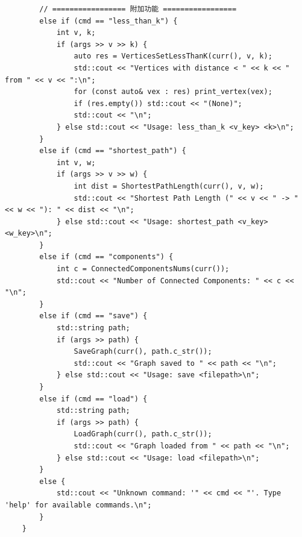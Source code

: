 \documentclass[supercite]{Experimental_Report}
\theoremstyle{definition}
\begin{document}
\begin{lstlisting}
		// ================= 附加功能 =================
		else if (cmd == "less_than_k") {
			int v, k;
			if (args >> v >> k) {
				auto res = VerticesSetLessThanK(curr(), v, k);
				std::cout << "Vertices with distance < " << k << " from " << v << ":\n";
				for (const auto& vex : res) print_vertex(vex);
				if (res.empty()) std::cout << "(None)";
				std::cout << "\n";
			} else std::cout << "Usage: less_than_k <v_key> <k>\n";
		}
		else if (cmd == "shortest_path") {
			int v, w;
			if (args >> v >> w) {
				int dist = ShortestPathLength(curr(), v, w);
				std::cout << "Shortest Path Length (" << v << " -> " << w << "): " << dist << "\n";
			} else std::cout << "Usage: shortest_path <v_key> <w_key>\n";
		}
		else if (cmd == "components") {
			int c = ConnectedComponentsNums(curr());
			std::cout << "Number of Connected Components: " << c << "\n";
		}
		else if (cmd == "save") {
			std::string path;
			if (args >> path) {
				SaveGraph(curr(), path.c_str());
				std::cout << "Graph saved to " << path << "\n";
			} else std::cout << "Usage: save <filepath>\n";
		}
		else if (cmd == "load") {
			std::string path;
			if (args >> path) {
				LoadGraph(curr(), path.c_str());
				std::cout << "Graph loaded from " << path << "\n";
			} else std::cout << "Usage: load <filepath>\n";
		}
		else {
			std::cout << "Unknown command: '" << cmd << "'. Type 'help' for available commands.\n";
		}
	}
	

\end{lstlisting}
\end{document}
